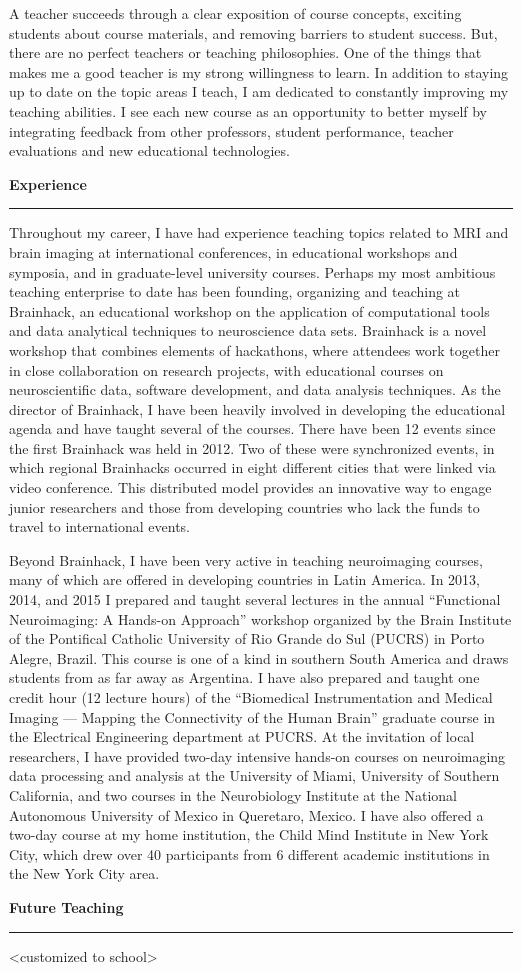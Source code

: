 \documentclass[letterpaper,11pt]{article}
\begin{document}
A teacher succeeds through a clear exposition of course concepts, exciting students about course materials, and removing barriers to student success. But, there are no perfect teachers or teaching philosophies. One of the things that makes me a good teacher is my strong willingness to learn. In addition to staying up to date on the topic areas I teach, I am dedicated to constantly improving my teaching abilities. I see each new course as an opportunity to better myself by integrating feedback from other professors, student performance, teacher evaluations and new educational technologies.

\textbf{\Large{Experience}} \smallskip \hrule \medskip

Throughout my career, I have had experience teaching topics related to MRI and brain imaging at international conferences, in educational workshops and symposia, and in graduate-level university courses. Perhaps my most ambitious teaching enterprise to date has been founding, organizing and teaching at Brainhack, an educational workshop on the application of computational tools and data analytical techniques to neuroscience data sets. Brainhack is a novel workshop that combines elements of hackathons, where attendees work together in close collaboration on research projects, with educational courses on neuroscientific data, software development, and data analysis techniques. As the director of Brainhack, I have been heavily involved in developing the educational agenda and have taught several of the courses. There have been 12 events since the first Brainhack was held in 2012. Two of these were synchronized events, in which regional Brainhacks occurred in eight different cities that were linked via video conference. This distributed model provides an innovative way to engage junior researchers and those from developing countries who lack the funds to travel to international events.

Beyond Brainhack, I have been very active in teaching neuroimaging courses, many of which are offered in developing countries in Latin America. In 2013, 2014, and 2015 I prepared and taught several lectures in the annual ``Functional Neuroimaging: A Hands-on Approach'' workshop organized by the Brain Institute of the Pontifical Catholic University of Rio Grande do Sul (PUCRS) in Porto Alegre, Brazil. This course is one of a kind in southern South America and draws students from as far away as Argentina. I have also prepared and taught one credit hour (12 lecture hours) of the ``Biomedical Instrumentation and Medical Imaging — Mapping the Connectivity of the Human Brain'' graduate course in the Electrical Engineering department at PUCRS. At the invitation of local researchers, I have provided two-day intensive hands-on courses on neuroimaging data processing and analysis at the University of Miami, University of Southern California, and two courses in the Neurobiology Institute at the National Autonomous University of Mexico in Queretaro, Mexico. I have also offered a two-day course at my home institution, the Child Mind Institute in New York City, which drew over 40 participants from 6 different academic institutions in the New York City area.

\textbf{\Large{Future Teaching}} \smallskip \hrule \medskip

<customized to school>
\end{document}
